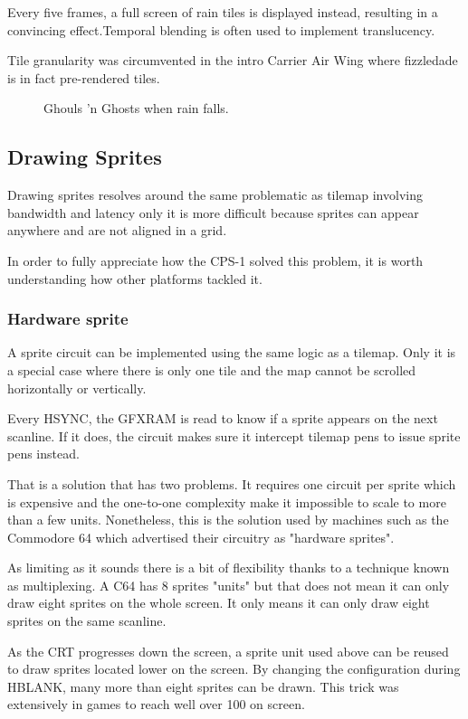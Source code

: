 Every five frames, a full screen of rain tiles is displayed instead, resulting in a convincing effect.Temporal blending is often used to implement translucency. 

Tile granularity was circumvented in the intro Carrier Air Wing where fizzledade is in fact pre-rendered tiles.

 

\vfill
\begin{figure}[!b]
 \caption*{Ghouls 'n Ghosts when rain falls.}%
 \end{figure}%
\pagebreak




\subsection{Drawing Sprites}
Drawing sprites resolves around the same problematic as tilemap involving bandwidth and latency only it is more difficult because sprites can appear anywhere and are not aligned in a grid.

In order to fully appreciate how the CPS-1 solved this problem, it is worth understanding how other platforms tackled it.

\subsubsection{Hardware sprite}
A sprite circuit can be implemented using the same logic as a tilemap. Only it is a special case where there is only one tile and the map cannot be scrolled horizontally or vertically.

Every HSYNC, the GFXRAM is read to know if a sprite appears on the next scanline. If it does, the circuit makes sure it intercept tilemap pens to issue sprite pens instead. 

That is a solution that has two problems. It requires one circuit per sprite which is expensive and the one-to-one complexity make it impossible to scale to more than a few units. Nonetheless, this is the solution used by machines such as the Commodore 64 which advertised their circuitry as "hardware sprites".


As limiting as it sounds there is a bit of flexibility thanks to a technique known as multiplexing. A C64 has 8 sprites "units" but that does not mean it can only draw eight sprites on the whole screen. It only means it can only draw eight sprites on the same scanline.

As the CRT progresses down the screen, a sprite unit used above can be reused to draw sprites located lower on the screen. By changing the configuration during HBLANK, many more than eight sprites can be drawn. This trick was extensively in games to reach well over 100 on screen.


